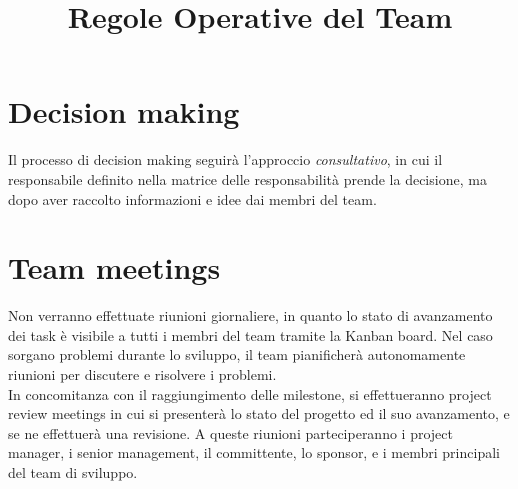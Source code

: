 \documentclass[a4paper,12pt]{article}
\title{\textbf{Regole Operative del Team}}
\author{}
\date{}
\begin{document}
\maketitle
\tableofcontents

\newpage


\section{Decision making}
Il processo di decision making seguirà l'approccio \textit{consultativo}, in cui il responsabile definito nella matrice
delle responsabilità prende la decisione, ma dopo aver raccolto informazioni e idee dai membri del team.


\section{Team meetings}
Non verranno effettuate riunioni giornaliere, in quanto lo stato di avanzamento dei task è visibile a tutti i membri
del team tramite la Kanban board. Nel caso sorgano problemi durante lo sviluppo, il team pianificherà autonomamente
riunioni per discutere e risolvere i problemi.\\
In concomitanza con il raggiungimento delle milestone, si effettueranno project review meetings in cui si presenterà
lo stato del progetto ed il suo avanzamento, e se ne effettuerà una revisione. A queste riunioni parteciperanno i
project manager, i senior management, il committente, lo sponsor, e i membri principali del team di sviluppo.
\end{document}
